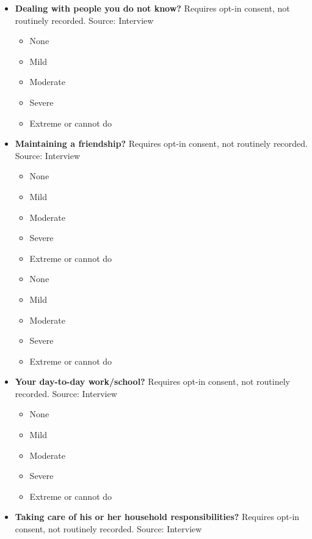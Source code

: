 \documentclass[
]{scrartcl}
\providecommand{\tightlist}{%
  \setlength{\itemsep}{0pt}\setlength{\parskip}{0pt}}\usepackage{longtable,booktabs,array}
\begin{document}
\begin{itemize}
  \begin{itemize}
  \tightlist
  \item
    None
  \item
    Mild
  \item
    Moderate
  \item
    Severe
  \item
    Extreme or cannot do
  \item
    None
  \item
    Mild
  \item
    Moderate
  \item
    Severe
  \item
    Extreme or cannot do
  \end{itemize}
\item
  \textbf{Dealing with people you do not know?} Requires opt-in consent,
  not routinely recorded. Source: Interview

  \begin{itemize}
  \tightlist
  \item
    None
  \item
    Mild
  \item
    Moderate
  \item
    Severe
  \item
    Extreme or cannot do
  \end{itemize}
\item
  \textbf{Maintaining a friendship?} Requires opt-in consent, not
  routinely recorded. Source: Interview

  \begin{itemize}
  \tightlist
  \item
    None
  \item
    Mild
  \item
    Moderate
  \item
    Severe
  \item
    Extreme or cannot do
  \item
    None
  \item
    Mild
  \item
    Moderate
  \item
    Severe
  \item
    Extreme or cannot do
  \end{itemize}
\item
  \textbf{Your day-to-day work/school?} Requires opt-in consent, not
  routinely recorded. Source: Interview

  \begin{itemize}
  \tightlist
  \item
    None
  \item
    Mild
  \item
    Moderate
  \item
    Severe
  \item
    Extreme or cannot do
  \end{itemize}
\item
  \textbf{Taking care of his or her household responsibilities?}
  Requires opt-in consent, not routinely recorded. Source: Interview


\end{itemize}
\end{document}
